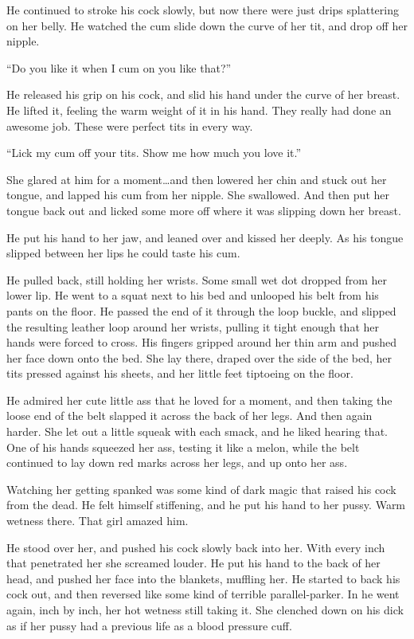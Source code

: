 \documentclass[letterpaper]{article}
\begin{document}
He continued to stroke his cock slowly, but now there were just drips splattering on her belly.
He watched the cum slide down the curve of her tit, and drop off her nipple.

``Do you like it when I cum on you like that?''

He released his grip on his cock, and slid his hand under the curve of her breast.
He lifted it, feeling the warm weight of it in his hand.
They really had done an awesome job. These were perfect tits in every way.

``Lick my cum off your tits. Show me how much you love it.''

She glared at him for a moment\ldots and then lowered her chin and stuck out her tongue, and lapped his cum from her nipple.
She swallowed.
And then put her tongue back out and licked some more off where it was slipping down her breast.

He put his hand to her jaw, and leaned over and kissed her deeply.
As his tongue slipped between her lips he could taste his cum.

He pulled back, still holding her wrists. Some small wet dot dropped from her lower lip.
He went to a squat next to his bed and unlooped his belt from his pants on the floor.
He passed the end of it through the loop buckle, and slipped the resulting leather loop around her wrists, pulling it tight enough that her hands were forced to cross.
His fingers gripped around her thin arm and pushed her face down onto the bed.
She lay there, draped over the side of the bed, her tits pressed against his sheets, and her little feet tiptoeing on the floor.

He admired her cute little ass that he loved for a moment, and then taking the loose end of the belt slapped it across the back of her legs. And then again harder. She let out a little squeak with each smack, and he liked hearing that.
One of his hands squeezed her ass, testing it like a melon, while the belt continued to lay down red marks across her legs, and up onto her ass.

Watching her getting spanked was some kind of dark magic that raised his cock from the dead.
He felt himself stiffening, and he put his hand to her pussy.
Warm wetness there. That girl amazed him.

He stood over her, and pushed his cock slowly back into her.
With every inch that penetrated her she screamed louder.
He put his hand to the back of her head, and pushed her face into the blankets, muffling her.
He started to back his cock out, and then reversed like some kind of terrible parallel-parker.
In he went again, inch by inch, her hot wetness still taking it.
She clenched down on his dick as if her pussy had a previous life as a blood pressure cuff.
\end{document}
